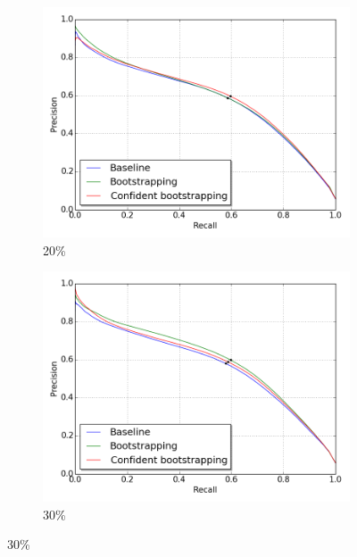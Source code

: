 \begin{figure}[H]
\begin{subfigure}{0.31\textwidth}
\end{subfigure}
\hspace*{\fill} %
\begin{subfigure}{0.31\textwidth}
\includegraphics[width=\textwidth]{figs/E2/pr_2.png}
\caption{20\% } \label{fig:app_E2_2_pr}
\vspace{-0.1cm} %
\end{subfigure}
\begin{subfigure}{0.31\textwidth}
\includegraphics[width=\textwidth]{figs/E2/pr_3.png}
\caption{ 30\%} \label{fig:app_E2_3_pr}
\vspace{-0.1cm} %

\end{subfigure}
\end{figure}
